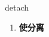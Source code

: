 
\begin{frame}
{\huge detach}
\begin{center}
\begin{enumerate}\Large
  \item \textbf{使分离}
\end{enumerate}
\end{center}
\end{frame}
